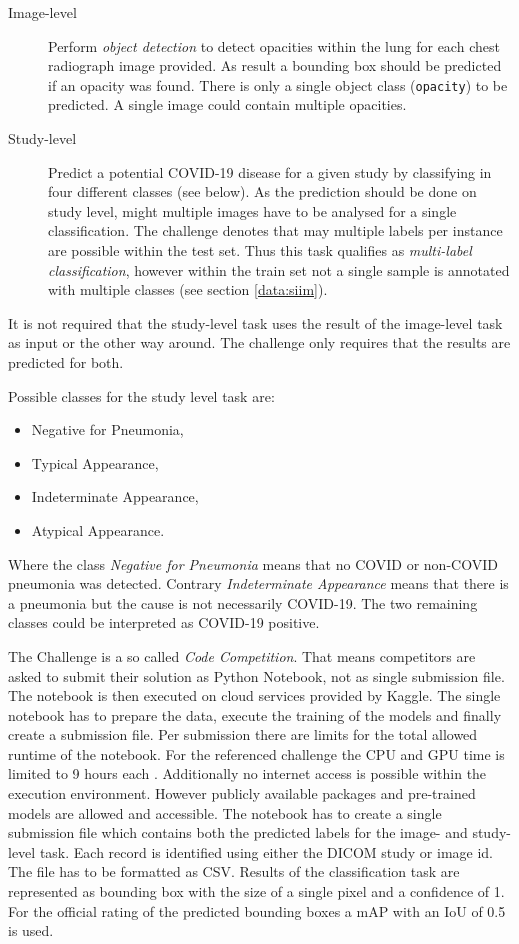 \begin{description}
    \item[Image-level] Perform \textit{object detection} to detect opacities within the lung for each chest radiograph image provided. As result a bounding box should be predicted if an opacity was found. There is only a single object class (\texttt{opacity}) to be predicted. A single image could contain multiple opacities.
    \item[Study-level] Predict a potential COVID-19 disease for a given study by classifying in four different classes (see below). As the prediction should be done on study level, might multiple images have to be analysed for a single classification. The challenge denotes that may multiple labels per instance are possible within the test set. Thus this task qualifies as \textit{multi-label classification}, however within the train set not a single sample is annotated with multiple classes (see section \ref{data:siim}).
\end{description}

It is not required that the study-level task uses the result of the image-level task as input or the other way around. The challenge only requires that the results are predicted for both.

Possible classes for the study level task are:

\begin{itemize}
    \item Negative for Pneumonia,
    \item Typical Appearance,
    \item Indeterminate Appearance,
    \item Atypical Appearance.
\end{itemize}

Where the class \textit{Negative for Pneumonia} means that no COVID or non-COVID pneumonia was detected. Contrary \textit{Indeterminate Appearance} means that there is a pneumonia but the cause is not necessarily COVID-19. The two remaining classes could be interpreted as COVID-19 positive.

The Challenge is a so called \textit{Code Competition}. That means competitors are asked to submit their solution as Python Notebook, not as single submission file. The notebook is then executed on cloud services provided by Kaggle. The single notebook has to prepare the data, execute the training of the models and finally create a submission file. Per submission there are limits for the total allowed runtime of the notebook. For the referenced challenge the CPU and GPU time is limited to 9 hours each \autocite{SIIMKaggle}. Additionally no internet access is possible within the execution environment. However publicly available packages and pre-trained models are allowed and accessible. The notebook has to create a single submission file which contains both the predicted labels for the image- and study-level task. Each record is identified using either the DICOM study or image id. The file has to be formatted as CSV. Results of the classification task are represented as bounding box with the size of a single pixel and a confidence of 1. For the official rating of the predicted bounding boxes a \ac{mAP} with an \ac{IoU} of 0.5 is used.

